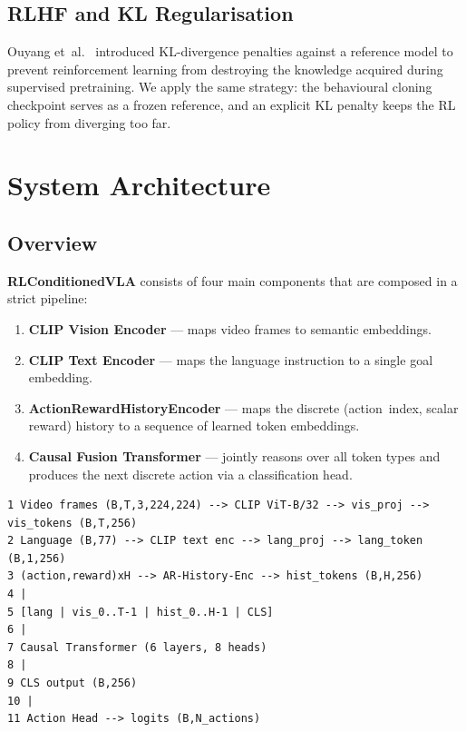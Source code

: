 \documentclass[12pt, a4paper]{article}
\begin{document}
\subsection{RLHF and KL Regularisation}

Ouyang et~al.~\cite{ouyang2022rlhf} introduced KL-divergence penalties
against a reference model to prevent reinforcement learning from destroying
the knowledge acquired during supervised pretraining.
We apply the same strategy: the behavioural cloning checkpoint serves as a
frozen reference, and an explicit KL penalty keeps the RL policy from
diverging too far.

\newpage

\section{System Architecture}
\label{sec:arch}

\subsection{Overview}

\textbf{RLConditionedVLA} consists of four main components that are
composed in a strict pipeline:

\begin{enumerate}[leftmargin=1.5em]
  \item \textbf{CLIP Vision Encoder} — maps video frames to semantic embeddings.
  \item \textbf{CLIP Text Encoder} — maps the language instruction to a single
        goal embedding.
  \item \textbf{ActionRewardHistoryEncoder} — maps the discrete (action~index,
        scalar reward) history to a sequence of learned token embeddings.
  \item \textbf{Causal Fusion Transformer} — jointly reasons over all token
        types and produces the next discrete action via a classification head.
\end{enumerate}

\begin{lstlisting}[style=Diagram, caption={High-level data flow through RLConditionedVLA.}]
1 Video frames (B,T,3,224,224) --> CLIP ViT-B/32 --> vis_proj --> vis_tokens (B,T,256)
2 Language (B,77) --> CLIP text enc --> lang_proj --> lang_token (B,1,256)
3 (action,reward)xH --> AR-History-Enc --> hist_tokens (B,H,256)
4 |
5 [lang | vis_0..T-1 | hist_0..H-1 | CLS]
6 |
7 Causal Transformer (6 layers, 8 heads)
8 |
9 CLS output (B,256)
10 |
11 Action Head --> logits (B,N_actions)
\end{lstlisting}
\end{document}
